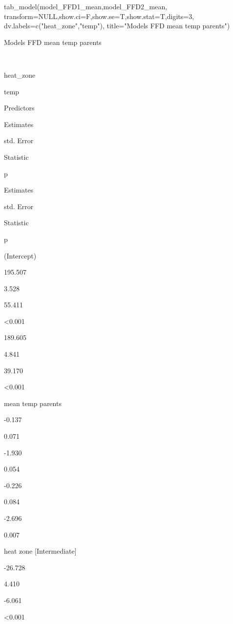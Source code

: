 \documentclass[
]{article}
\newenvironment{Shaded}{\begin{snugshade}}{\end{snugshade}}
\newcommand{\AttributeTok}[1]{\textcolor[rgb]{0.77,0.63,0.00}{#1}}
\newcommand{\ConstantTok}[1]{\textcolor[rgb]{0.00,0.00,0.00}{#1}}
\newcommand{\DecValTok}[1]{\textcolor[rgb]{0.00,0.00,0.81}{#1}}
\newcommand{\FunctionTok}[1]{\textcolor[rgb]{0.00,0.00,0.00}{#1}}
\newcommand{\NormalTok}[1]{#1}
\newcommand{\StringTok}[1]{\textcolor[rgb]{0.31,0.60,0.02}{#1}}
\begin{document}
\begin{Shaded}
\begin{Highlighting}[]
\FunctionTok{tab\_model}\NormalTok{(model\_FFD1\_mean,model\_FFD2\_mean,}
          \AttributeTok{transform=}\ConstantTok{NULL}\NormalTok{,}\AttributeTok{show.ci=}\NormalTok{F,}\AttributeTok{show.se=}\NormalTok{T,}\AttributeTok{show.stat=}\NormalTok{T,}\AttributeTok{digits=}\DecValTok{3}\NormalTok{,}
          \AttributeTok{dv.labels=}\FunctionTok{c}\NormalTok{(}\StringTok{"heat\_zone"}\NormalTok{,}\StringTok{"temp"}\NormalTok{),}
          \AttributeTok{title=}\StringTok{"Models FFD mean temp parents"}\NormalTok{)}
\end{Highlighting}
\end{Shaded}

Models FFD mean temp parents

~

heat\_zone

temp

Predictors

Estimates

std. Error

Statistic

p

Estimates

std. Error

Statistic

p

(Intercept)

195.507

3.528

55.411

\textless0.001

189.605

4.841

39.170

\textless0.001

mean temp parents

-0.137

0.071

-1.930

0.054

-0.226

0.084

-2.696

0.007

heat zone {[}Intermediate{]}

-26.728

4.410

-6.061

\textless0.001
\end{document}

